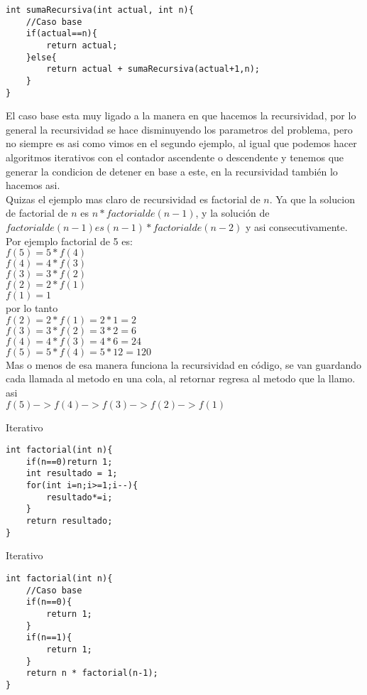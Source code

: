\begin{minipage}{\textwidth}
\begin{lstlisting}[style=C,caption=sumaRecursiva2.cpp]
int sumaRecursiva(int actual, int n){
    //Caso base
    if(actual==n){
        return actual;
    }else{
        return actual + sumaRecursiva(actual+1,n);
    }
}
\end{lstlisting}
\end{minipage}
El caso base esta muy ligado a la manera en que hacemos la recursividad, por lo general la 
recursividad se hace disminuyendo los parametros del problema, pero no siempre es asi como 
vimos en el segundo ejemplo, al igual que podemos hacer algoritmos iterativos con el contador
ascendente o descendente y tenemos que generar la condicion de detener en base a este, en la
recursividad también lo hacemos asi.
\\Quizas el ejemplo mas claro de recursividad es factorial de $n$. Ya que la solucion de factorial
de $n$ es $n * factorial de (n-1)$, y la solución de $factorial de (n-1) es (n-1) * factorial de (n-2)$ y asi consecutivamente. Por ejemplo factorial de 5 es:
\\$f(5) = 5*f(4)$
\\$f(4) = 4*f(3)$
\\$f(3) = 3*f(2)$
\\$f(2) = 2*f(1)$
\\$f(1) = 1$
\\por lo tanto
\\$f(2) = 2*f(1) = 2*1 = 2$
\\$f(3) = 3*f(2) = 3*2 = 6$
\\$f(4) = 4*f(3) = 4*6 = 24$
\\$f(5) = 5*f(4) = 5*12 = 120$
\\Mas o menos de esa manera funciona la recursividad en código, se van guardando cada llamada al 
metodo en una cola, al retornar regresa al metodo que la llamo. asi 
\\$f(5)->f(4)->f(3)->f(2)->f(1)$
\\\begin{minipage}{\textwidth}
Iterativo
\begin{lstlisting}[style=C,caption=factorialIterativo.cpp]
int factorial(int n){
    if(n==0)return 1;
    int resultado = 1;
    for(int i=n;i>=1;i--){
        resultado*=i;
    }
    return resultado;
}
\end{lstlisting}
\end{minipage}

\begin{minipage}{\textwidth}
Iterativo
\begin{lstlisting}[style=C,caption=factorialRecursivo.cpp]
int factorial(int n){
    //Caso base
    if(n==0){
        return 1;
    }
    if(n==1){
        return 1;
    }
    return n * factorial(n-1);
}
\end{lstlisting}
\end{minipage}


